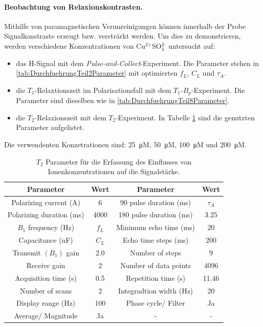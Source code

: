 \documentclass[../main.tex]{subfiles}
\begin{document}
    \paragraph{Beobachtung von Relaxionskontrasten.}
        Mithilfe von paramagnetischen Verunreinigungen können innerhalb der Probe Signalkonstraste erzeugt bzw. versträrkt werden. Um dies zu demonstrieren, werden verschiedene Konzentrationen von Cu$^\text{2+}$SO$_\text{4}^\text{2-}$ untersucht auf:
        \begin{itemize}
            \item das H-Signal mit dem \textit{Pulse-and-Collect}-Experiment. Die Parameter stehen in \ref{tab:DurchfuehrungTeil2Parameter} mit optimierten $f_L$, $C_L$ und $\tau_A$.
            \item die $T_1$-Relaxtionszeit im Polarisationsfall mit dem \textit{$T_1$-$B_p$}-Experiment. Die Parameter sind dieselben wie in \ref{tab:DurchfuehrungTeil8Parameter}.
            \item die $T_2$-Relaxionszeit mit dem $T_2$-Experiment. In Tabelle \ref{tab:DurchfuehrungTeil11ParameterT2} sind die genutzten Parameter aufgelistet.
        \end{itemize}
        Die verwendenten Konzetrationen sind: \SI{25}{\micro M}, \SI{50}{\micro M}, \SI{100}{\micro M} und \SI{200}{\micro M}.

        \begin{table}[H]
            \centering
            \begin{tabular}{cc|cc}
                \textbf{Parameter} & \textbf{Wert} & \textbf{Parameter} & \textbf{Wert}  \\\hline\hline
                Polarizing current (\si{\ampere}) & 6 & 90 pulse duration (\si{\milli\second}) & $\tau_A$ \\\hline
                Polarizing duration (\si{\milli\second}) & 4000 & 180 pulse duration (\si{\milli\second}) & 3.25 \\\hline
                $B_1$ frequency (\si{\hertz}) & $f_L$ & Minimum echo time (\si{\milli\second}) & 20 \\\hline
                Capacitance (\si{\nano\farad}) & $C_L$ & Echo time steps (\si{\milli\second}) & 200 \\\hline
                Transmit $(B_1)$ gain & \num{2.0} & Number of steps & 9 \\\hline
                Receive gain & 2 & Number of data points & 4096\\\hline
                Acquisition time (\si{\second}) & \num{0.5} & Repetition time (\si{\second}) & \num{11.46} \\\hline
                Number of scans & 2 & Integradtion width (\si{\hertz}) & 20 \\\hline
                Display range (\si{\hertz}) & 100 & Phase cycle/ Filter & Ja \\\hline
                Average/ Magnitude & Ja & - & - 
            \end{tabular}
            \caption{\textit{$T_2$} Parameter für die Erfassung des Einflusses von Ionenkonzentrationen auf die Signalstärke.}
            \label{tab:DurchfuehrungTeil11ParameterT2}
        \end{table}
\end{document}
